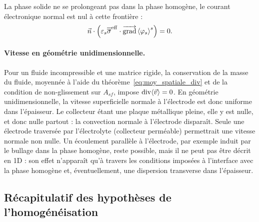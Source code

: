La phase solide ne se prolongeant pas dans la phase homogène, le courant
électronique normal est nul à cette frontière :
\begin{equation}
\vec{n} \cdot
\left(
\varepsilon_s \overline{\overline{\sigma}}^{\mathrm{eff}}
\cdot\mathop{\overrightarrow{\operatorname{grad}}}\nolimits \left\langle \varphi_s \right\rangle^s
\right)
=0 .
\end{equation}

\paragraph{Vitesse en géométrie unidimensionnelle.} Pour un fluide
incompressible et une matrice rigide, la conservation de la masse du fluide,
moyennée à l'aide du théorème~\eqref{eq:moy_spatiale_div} et de la condition de
non-glissement sur $A_{sf}$, impose $\operatorname{div}\langle \vec{v} \rangle = 0$. En géométrie
unidimensionnelle, la vitesse superficielle normale à l'électrode est donc
uniforme dans l'épaisseur. Le collecteur étant une plaque métallique
pleine, elle y est nulle, et donc nulle partout : la convection normale à
l'électrode disparaît. Seule une électrode traversée par l'électrolyte
(collecteur perméable) permettrait une vitesse normale non nulle. Un
écoulement parallèle à l'électrode, par exemple induit par le bullage dans la
phase homogène, reste possible, mais il ne peut pas être décrit en 1D : son
effet n'apparaît qu'à travers les conditions imposées à l'interface avec la
phase homogène et, éventuellement, une dispersion transverse dans
l'épaisseur.

\subsection*{Récapitulatif des hypothèses de l'homogénéisation}

